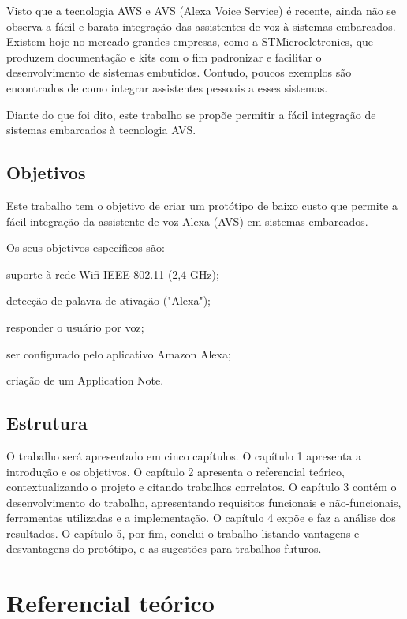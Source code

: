 \documentclass[
    12pt,
    openright,
    twoside,
    a4paper,
    english,
    spanish,
    brazil,
    ]{abntex2}
\begin{document}
Visto que a tecnologia AWS e AVS (Alexa Voice Service) é recente, ainda não se observa a fácil e barata integração das assistentes de voz à sistemas embarcados. Existem hoje no mercado grandes empresas, como a STMicroeletronics, que produzem documentação e kits com o fim padronizar e facilitar o desenvolvimento de sistemas embutidos. Contudo, poucos exemplos são encontrados de como integrar assistentes pessoais a esses sistemas.

Diante do que foi dito, este trabalho se propõe permitir a fácil integração de sistemas embarcados à tecnologia AVS.
\section{Objetivos}
Este trabalho tem o objetivo de criar um protótipo de baixo custo que permite a fácil integração da assistente de voz Alexa (AVS) em sistemas embarcados.

Os seus objetivos específicos são:
\begin{alineas}
	\item suporte à rede Wifi IEEE 802.11 (2,4 GHz);
	\item detecção de palavra de ativação ("Alexa");
	\item responder o usuário por voz;
	\item ser configurado pelo aplicativo Amazon Alexa;
	\item criação de um Application Note.
\end{alineas}
\section{Estrutura}
O trabalho será apresentado em cinco capítulos. O capítulo 1 apresenta a introdução e os objetivos. O capítulo 2 apresenta o referencial teórico, contextualizando o projeto e citando trabalhos correlatos. O capítulo 3 contém o desenvolvimento do trabalho, apresentando requisitos funcionais e não-funcionais, ferramentas utilizadas e a implementação. O capítulo 4 expõe e faz a análise dos resultados. O capítulo 5, por fim, conclui o trabalho listando vantagens e desvantagens do protótipo, e as sugestões para trabalhos futuros.

\chapter{Referencial teórico}
\end{document}
